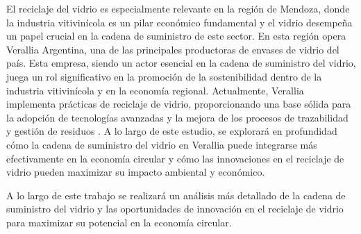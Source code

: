 \documentclass[main.tex]{subfiles}
\begin{document}
El reciclaje del vidrio es especialmente relevante en la región de Mendoza, donde la industria vitivinícola es un pilar económico fundamental y el vidrio desempeña un papel crucial en la cadena de suministro de este sector. En esta región opera Verallia Argentina, una de las principales productoras de envases de vidrio del país. Esta empresa, siendo un actor esencial en la cadena de suministro del vidrio, juega un rol significativo en la promoción de la sostenibilidad dentro de la industria vitivinícola y en la economía regional. Actualmente, Verallia implementa prácticas de reciclaje de vidrio, proporcionando una base sólida para la adopción de tecnologías avanzadas y la mejora de los procesos de trazabilidad y gestión de residuos \cite{prodvidrio2024verallia}. A lo largo de este estudio, se explorará en profundidad cómo la cadena de suministro del vidrio en Verallia puede integrarse más efectivamente en la economía circular y cómo las innovaciones en el reciclaje de vidrio pueden maximizar su impacto ambiental y económico.

A lo largo de este trabajo se realizará un análisis más detallado de la cadena de suministro del vidrio y las oportunidades de innovación en el reciclaje de vidrio para maximizar su potencial en la economía circular.
\end{document}

